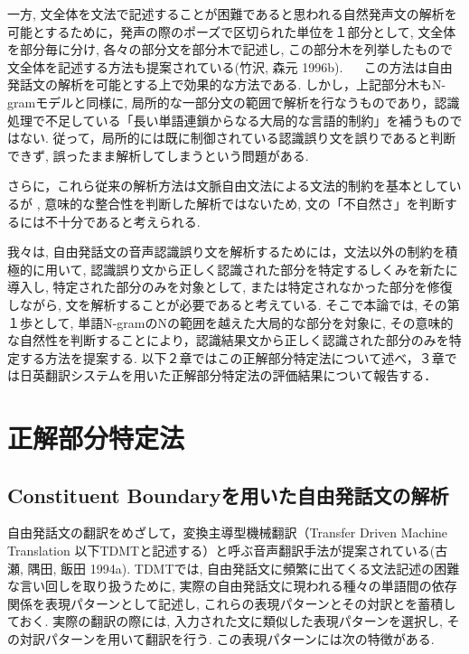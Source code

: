 一方, 文全体を文法で記述することが困難であると思われる自然発声文の解析を可能とするために，発声の際のポーズで区切られた単位を１部分として, 文全体を部分毎に分け, 各々の部分文を部分木で記述し, この部分木を列挙したもので文全体を記述する方法も提案されている(竹沢, 森元 1996b). 　
この方法は自由発話文の解析を可能とする上で効果的な方法である. しかし，上記部分木もN-gramモデルと同様に, 局所的な一部分文の範囲で解析を行なうものであり，認識処理で不足している「長い単語連鎖からなる大局的な言語的制約」を補うものではない. 
従って，局所的には既に制御されている認識誤り文を誤りであると判断できず, 誤ったまま解析してしまうという問題がある. 

さらに，これら従来の解析方法は文脈自由文法による文法的制約を基本としているが
, 意味的な整合性を判断した解析ではないため, 文の「不自然さ」を判断するには不十分であると考えられる. 

我々は, 自由発話文の音声認識誤り文を解析するためには，文法以外の制約を積極的に用いて, 認識誤り文から正しく認識された部分を特定するしくみを新たに導入し, 特定された部分のみを対象として, または特定されなかった部分を修復しながら, 文を解析することが必要であると考えている. 
そこで本論では, その第１歩として, 単語N-gramのNの範囲を越えた大局的な部分を対象に, その意味的な自然性を判断することにより，認識結果文から正しく認識された部分のみを特定する方法を提案する. 
以下２章ではこの正解部分特定法について述べ，３章では日英翻訳システムを用いた正解部分特定法の評価結果について報告する．

\section{正解部分特定法}

\subsection{Constituent Boundaryを用いた自由発話文の解析}

自由発話文の翻訳をめざして，変換主導型機械翻訳（Transfer Driven Machine Translation 以下TDMTと記述する）と呼ぶ音声翻訳手法が提案されている(古瀬, 隅田, 飯田 1994a). 
TDMTでは, 自由発話文に頻繁に出てくる文法記述の困難な言い回しを取り扱うために, 実際の自由発話文に現われる種々の単語間の依存関係を表現パターンとして記述し, これらの表現パターンとその対訳とを蓄積しておく. 実際の翻訳の際には, 入力された文に類似した表現パターンを選択し, その対訳パターンを用いて翻訳を行う. 
この表現パターンには次の特徴がある. 

\vspace{0.5cm}

